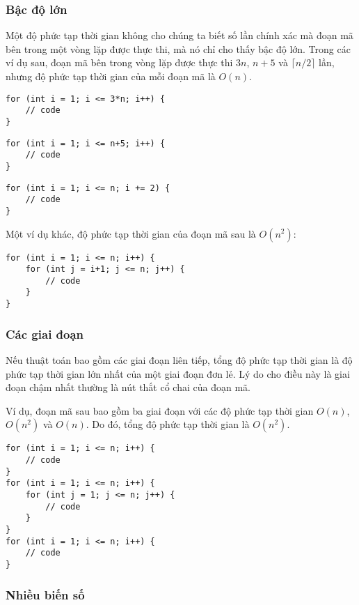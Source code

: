 \subsubsection*{Bậc độ lớn}

Một độ phức tạp thời gian không cho chúng ta biết số lần chính xác
mà đoạn mã bên trong một vòng lặp được thực thi,
mà nó chỉ cho thấy bậc độ lớn.
Trong các ví dụ sau, đoạn mã bên trong vòng lặp
được thực thi $3n$, $n+5$ và $\lceil n/2 \rceil$ lần,
nhưng độ phức tạp thời gian của mỗi đoạn mã là $O(n)$.

\begin{lstlisting}
for (int i = 1; i <= 3*n; i++) {
    // code
}
\end{lstlisting}

\begin{lstlisting}
for (int i = 1; i <= n+5; i++) {
    // code
}
\end{lstlisting}

\begin{lstlisting}
for (int i = 1; i <= n; i += 2) {
    // code
}
\end{lstlisting}

Một ví dụ khác,
độ phức tạp thời gian của đoạn mã sau là $O(n^2)$:

\begin{lstlisting}
for (int i = 1; i <= n; i++) {
    for (int j = i+1; j <= n; j++) {
        // code
    }
}
\end{lstlisting}

\subsubsection*{Các giai đoạn}

Nếu thuật toán bao gồm các giai đoạn liên tiếp,
tổng độ phức tạp thời gian là độ phức tạp thời gian lớn nhất
của một giai đoạn đơn lẻ.
Lý do cho điều này là giai đoạn chậm nhất
thường là nút thắt cổ chai của đoạn mã.

Ví dụ, đoạn mã sau bao gồm
ba giai đoạn với các độ phức tạp thời gian
$O(n)$, $O(n^2)$ và $O(n)$.
Do đó, tổng độ phức tạp thời gian là $O(n^2)$.

\begin{lstlisting}
for (int i = 1; i <= n; i++) {
    // code
}
for (int i = 1; i <= n; i++) {
    for (int j = 1; j <= n; j++) {
        // code
    }
}
for (int i = 1; i <= n; i++) {
    // code
}
\end{lstlisting}

\subsubsection*{Nhiều biến số}

